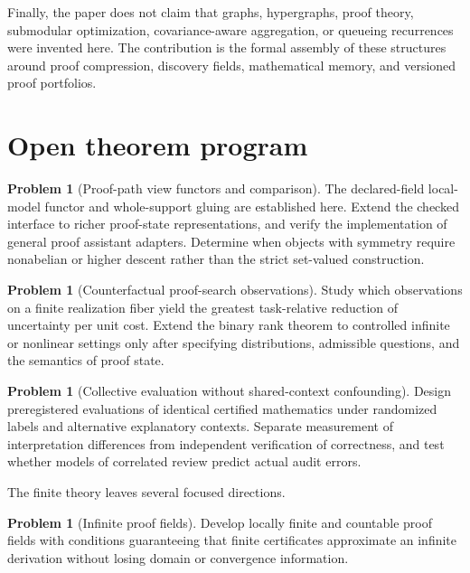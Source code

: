 \documentclass[11pt,oneside]{article}
\theoremstyle{definition}
\newtheorem{problem}[theorem]{Problem}
\theoremstyle{remark}
\begin{document}
Finally, the paper does not claim that graphs, hypergraphs, proof theory, submodular optimization, covariance-aware aggregation, or queueing recurrences were invented here. The contribution is the formal assembly of these structures around proof compression, discovery fields, mathematical memory, and versioned proof portfolios.

\section{Open theorem program}

\begin{problem}[Proof-path view functors and comparison]
The declared-field local-model functor and whole-support gluing are established here. Extend the checked interface to richer proof-state representations, and verify the implementation of general proof assistant adapters. Determine when objects with symmetry require nonabelian or higher descent rather than the strict set-valued construction.
\end{problem}

\begin{problem}[Counterfactual proof-search observations]
Study which observations on a finite realization fiber yield the greatest task-relative reduction of uncertainty per unit cost. Extend the binary rank theorem to controlled infinite or nonlinear settings only after specifying distributions, admissible questions, and the semantics of proof state.
\end{problem}

\begin{problem}[Collective evaluation without shared-context confounding]
Design preregistered evaluations of identical certified mathematics under randomized labels and alternative explanatory contexts. Separate measurement of interpretation differences from independent verification of correctness, and test whether models of correlated review predict actual audit errors.
\end{problem}



The finite theory leaves several focused directions.

\begin{problem}[Infinite proof fields]
Develop locally finite and countable proof fields with conditions guaranteeing that finite certificates approximate an infinite derivation without losing domain or convergence information.
\end{problem}
\end{document}
